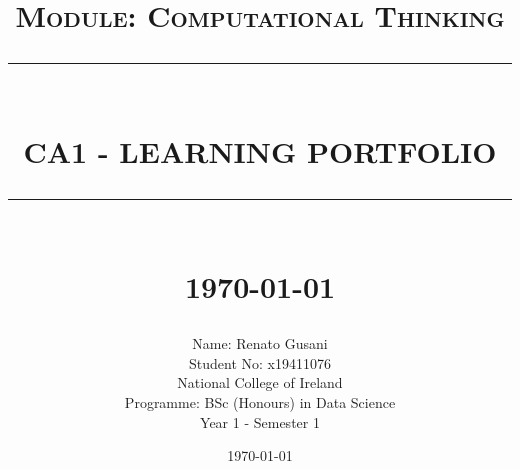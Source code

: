 \documentclass[12pt]{article}
\newcommand{\HRule}[1]{\rule{\linewidth}{#1}}
\begin{document}
\title{ \normalsize \textsc{Module: Computational Thinking}
		\\ [2.0cm]
		\HRule{0.5pt} \\
		\LARGE \textbf{\uppercase{CA1 - Learning Portfolio}}
		\HRule{2pt} \\ [0.5cm]
		\normalsize \today \vspace*{5\baselineskip}}
\date{\today}
\author{
        Name: Renato Gusani \\
		Student No: x19411076 \\ 
		National College of Ireland \\
		Programme: BSc (Honours) in Data Science \\
		Year 1 - Semester 1 }
\maketitle
\newpage
\sectionfont{\scshape}
\end{document}
